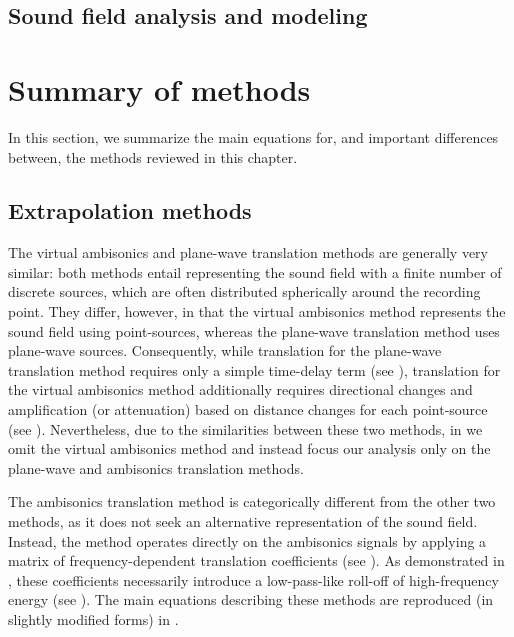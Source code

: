 \subsection{Sound field analysis and modeling}\label{sec:03_Navigation_Techniques:Thiergart_Method}


\section{Summary of methods}
In this section, we summarize the main equations for, and important differences between, the methods reviewed in this chapter.

\subsection{Extrapolation methods}
The virtual ambisonics and plane-wave translation methods are generally very similar:
both methods entail representing the sound field with a finite number of discrete sources, which are often distributed spherically around the recording point.
They differ, however, in that the virtual ambisonics method represents the sound field using point-sources, whereas the plane-wave translation method uses plane-wave sources.
Consequently, while translation for the plane-wave translation method requires only a simple time-delay term (see ), translation for the virtual ambisonics method additionally requires directional changes and amplification (or attenuation) based on distance changes for each point-source (see ).
Nevertheless, due to the similarities between these two methods, in  we omit the virtual ambisonics method and instead focus our analysis only on the plane-wave and ambisonics translation methods.

The ambisonics translation method is categorically different from the other two methods, as it does not seek an alternative representation of the sound field.
Instead, the method operates directly on the ambisonics signals by applying a matrix of frequency-dependent translation coefficients (see ).
As demonstrated in , these coefficients necessarily introduce a low-pass-like roll-off of high-frequency energy (see ).
The main equations describing these methods are reproduced (in slightly modified forms) in .

